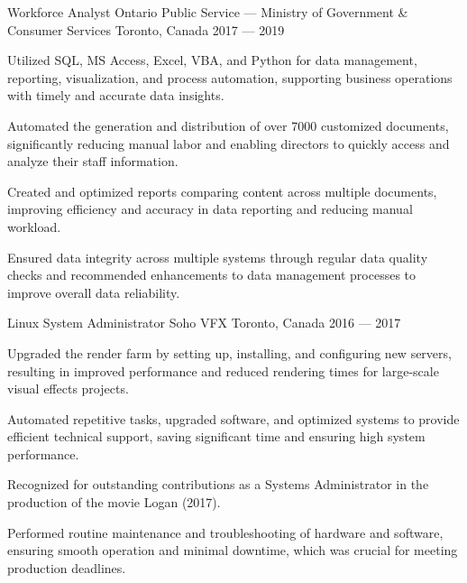 \begin{cventries}
\cventry%
  {Workforce Analyst}
  {Ontario Public Service --- Ministry of Government \& Consumer Services}
  {Toronto, Canada}
  {2017 --- 2019}
  {
    \begin{cvitems}
      \item Utilized SQL, MS Access, Excel, VBA, and Python for data management, reporting, visualization, and process automation, supporting business operations with timely and accurate data insights.
      \item Automated the generation and distribution of over 7000 customized documents, significantly reducing manual labor and enabling directors to quickly access and analyze their staff information.
      \item Created and optimized reports comparing content across multiple documents, improving efficiency and accuracy in data reporting and reducing manual workload.
      \item Ensured data integrity across multiple systems through regular data quality checks and recommended enhancements to data management processes to improve overall data reliability.
    \end{cvitems}
  }

\cventry%
  {Linux System Administrator}
  {Soho VFX}
  {Toronto, Canada}
  {2016 --- 2017}
  {
    \begin{cvitems}
      \item Upgraded the render farm by setting up, installing, and configuring new servers, resulting in improved performance and reduced rendering times for large-scale visual effects projects.
      \item Automated repetitive tasks, upgraded software, and optimized systems to provide efficient technical support, saving significant time and ensuring high system performance.
      \item Recognized for outstanding contributions as a Systems Administrator in the production of the movie Logan (2017).
      \item Performed routine maintenance and troubleshooting of hardware and software, ensuring smooth operation and minimal downtime, which was crucial for meeting production deadlines.
    \end{cvitems}
  }
\end{cventries}
